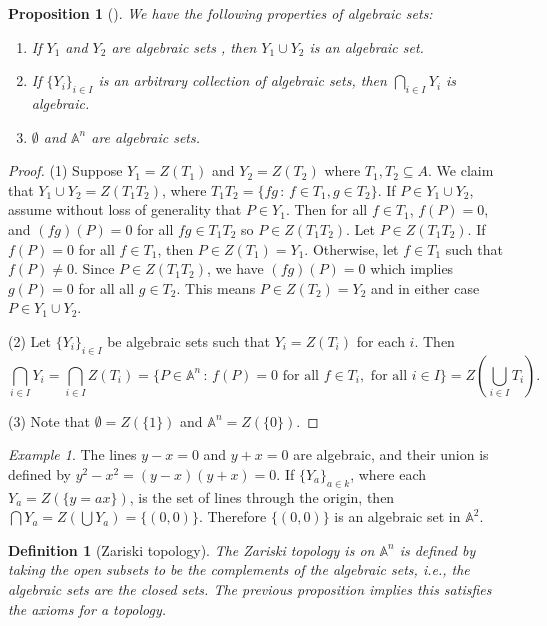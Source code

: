 \documentclass[12pt]{amsart}
\newcommand{\An}{\mathbb{A}^n}
\newtheorem{definition}[theorem]{Definition}
\newtheorem{proposition}[theorem]{Proposition}
\theoremstyle{remark}
\theoremstyle{remark}
\newtheorem*{example}{Example}
\theoremstyle{remark}
\begin{document}
\begin{proposition}[{\cite[Prop 1.1]{Hartshorne77}}]
We have the following properties of algebraic sets:
\begin{enumerate}
\item
If $Y_1$ and $Y_2$ are algebraic sets , then $Y_1 \cup Y_2$ is an algebraic set.

\item
If $\{Y_i\}_{i \in I}$ is an arbitrary collection of algebraic sets, then $\bigcap_{i \in I} Y_i$ is algebraic.

\item
$\emptyset$ and $\An$ are algebraic sets.
\end{enumerate}
\end{proposition}
\begin{proof}
(1) Suppose $Y_1 = Z(T_1)$ and $Y_2 = Z(T_2)$ where $T_1, T_2 \subseteq A$.
We claim that $Y_1 \cup Y_2 = Z(T_1 T_2)$, where $T_1 T_2 = \{f g \, : \, f \in T_1, g \in T_2\}$.
If $P \in Y_1 \cup Y_2$, assume without loss of generality that $P \in Y_1$.
Then for all $f \in T_1$, $f(P) = 0$, and $(fg)(P) = 0$ for all $fg \in T_1 T_2$ so $P \in Z(T_1 T_2)$.
Let $P \in Z(T_1 T_2)$.
If $f(P) = 0$ for all $f \in T_1$, then $P \in Z(T_1) = Y_1$.
Otherwise, let $f \in T_1$ such that $f(P) \ne 0$.
Since $P \in Z(T_1 T_2)$, we have $(fg)(P) = 0$ which implies $g(P) = 0$ for all all $g \in T_2$.
This means $P \in Z(T_2) = Y_2$ and in either case $P \in Y_1 \cup Y_2$.

(2) Let $\{Y_i\}_{i \in I}$ be algebraic sets such that $Y_i = Z(T_i)$ for each $i$.
Then
$$\bigcap_{i \in I} Y_i = \bigcap_{i \in I} Z(T_i) = \{P \in \An \, : \, f(P) = 0 \text{ for all } f  \in T_i, \text{ for all } i \in I\} = Z\left( \bigcup_{i \in I} T_i\right).$$

(3) Note that $\emptyset = Z(\{1\})$ and $\An = Z(\{0\})$.
\end{proof}

\begin{example}
The lines $y - x = 0$ and $y + x = 0$ are algebraic, and their union is defined by $y^2 - x^2 = (y-x)(y+x) = 0$.
If $\{Y_a\}_{a \in k}$, where each $Y_a = Z(\{y=ax\})$, is the set of lines through the origin, then $\bigcap Y_a = Z \left(\bigcup Y_a\right) = \{(0, 0)\}$.
Therefore $\{(0, 0)\}$ is an algebraic set in $\mathbb{A}^2$. 
\end{example}

\begin{definition}[Zariski topology]
The Zariski topology is on $\An$ is defined by taking the open subsets to be the complements of the algebraic sets, i.e., the algebraic sets are the closed sets.
The previous proposition implies this satisfies the axioms for a topology.
\end{definition}
\end{document}
